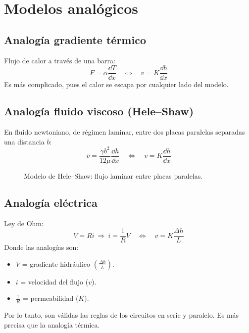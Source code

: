\section{Modelos analógicos}

\subsection{Analogía gradiente térmico}
Flujo de calor a través de una barra:
\[
F=\alpha\frac{\dd T}{\dd x}\quad\Longleftrightarrow\quad v=K\frac{\dd h}{\dd x}
\]
Es más complicado, pues el calor se escapa por cualquier lado del modelo.

\subsection{Analogía fluido viscoso (Hele--Shaw)}
En fluido newtoniano, de régimen laminar, entre dos placas paralelas
separadas una distancia $b$:
\[
\bar v=\frac{\gamma b^2}{12\mu}\frac{\dd h}{\dd x}\quad\Longleftrightarrow\quad v=K\frac{\dd h}{\dd x}
\]

\begin{figure}[H]
\centering
{}
\caption{Modelo de Hele--Shaw: flujo laminar entre placas paralelas.}
\end{figure}

\subsection{Analogía eléctrica}
Ley de Ohm:
\[
V=Ri\ \Rightarrow\ i=\frac1R V\quad\Longleftrightarrow\quad v=K\frac{\Delta h}{L}
\]
Donde las analogías son:
\begin{itemize}
  \item $V$ = gradiente hidráulico $\left(\frac{\Delta h}{L}\right)$.
  \item $i$ = velocidad del flujo ($v$).
  \item $\frac1R$ = permeabilidad ($K$).
\end{itemize}
Por lo tanto, son válidas las reglas de los circuitos en serie y paralelo.
Es más precisa que la analogía térmica.

